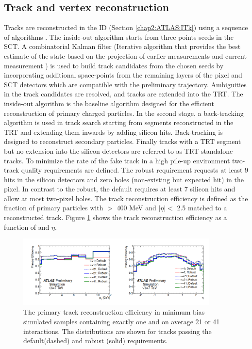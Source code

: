 \subsection{Track and vertex reconstruction}
\label{chap2:Objects:Trk}
Tracks are reconstructed in the ID (Section \ref{chap2:ATLAS:ITk}) using a sequence of algorithms \cite{Track_Reco, New_Trk}. The inside-out algorithm starts from three points seeds in the SCT. A combinatorial Kalman filter (Iterative algorithm that provides the best estimate of the state based on the projection of earlier measurements and current measurement \cite{Kalman}) is used to build track candidates from the chosen seeds by incorporating additional space-points from the remaining layers of the pixel and SCT detectors which are compatible with the preliminary trajectory. Ambiguities in the track candidates are resolved, and tracks are extended into the TRT. The inside-out algorithm is the baseline algorithm designed for the efficient reconstruction of primary charged particles. In the second stage, a back-tracking algorithm is used in track search starting from segments reconstructed in the TRT and extending them inwards by adding silicon hits. Back-tracking is designed to reconstruct secondary particles. Finally tracks with a TRT segment but no extension into the silicon detectors are referred to as TRT-standalone tracks. To minimize the rate of the fake track in a high pile-up environment two-track quality requirements are defined. The robust requirement requests at least 9 hits in the silicon detectors and zero holes (non-existing but expected hit) in the pixel. In contrast to the robust, the default requires at least 7 silicon hits and allow at most two-pixel holes. The track reconstruction efficiency is defined as the fraction of primary particles with \pT $>$ 400 MeV and $|\eta|<$ 2.5 matched to a reconstructed track. Figure \ref{fig:chap2:Objects:Trk:Eff} shows the track reconstruction efficiency as a function of \pT and $\eta$.
\begin{figure}[htbp]
    \centering
    \includegraphics[width=0.9\textwidth]{Ch2/Img/Track_reco_eff.png}
    \caption{The primary track reconstruction efficiency in minimum bias simulated samples containing exactly one and on average 21 or 41 interactions. The distributions are shown for tracks passing the default(dashed) and robust (solid) requirements.}
    \label{fig:chap2:Objects:Trk:Eff}
\end{figure}
